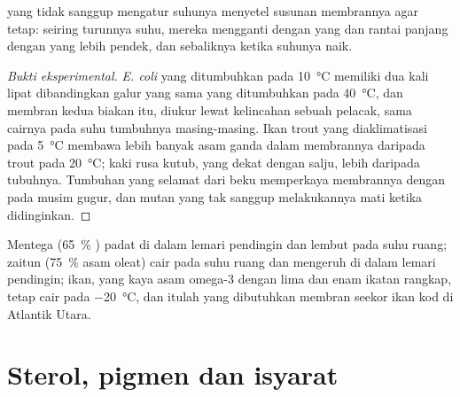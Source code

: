 \begin{proposition}\label{prop:b1:lipids:homeoviscous}
 yang tidak sanggup mengatur suhunya menyetel susunan
membrannya agar  tetap: seiring turunnya suhu, mereka
mengganti  dengan yang  dan rantai panjang
dengan yang lebih pendek, dan sebaliknya ketika suhunya naik.
\end{proposition}
\begin{proof}[Bukti eksperimental]
\emph{E. coli} yang ditumbuhkan pada \qty{10}{\celsius} memiliki dua
kali lipat  dibandingkan galur yang sama yang
ditumbuhkan pada \qty{40}{\celsius}, dan membran kedua biakan itu,
diukur lewat kelincahan sebuah pelacak, sama cairnya pada suhu
tumbuhnya masing-masing. Ikan trout yang diaklimatisasi pada
\qty{5}{\celsius} membawa lebih banyak asam  ganda dalam 
membrannya daripada trout pada \qty{20}{\celsius};  kaki rusa
kutub, yang dekat dengan salju, lebih  daripada 
 tubuhnya. Tumbuhan yang selamat dari beku memperkaya membrannya
dengan   pada musim gugur, dan mutan yang tak sanggup
melakukannya mati ketika didinginkan.
\end{proof}

\begin{example}\label{ex:b1:lipids:kitchen}
Mentega (\qty{65}{\%} ) padat di dalam lemari pendingin dan lembut
pada suhu ruang;  zaitun (\qty{75}{\%} asam oleat) cair pada suhu
ruang dan mengeruh di dalam lemari pendingin;  ikan, yang kaya
asam omega-3 dengan lima dan enam ikatan rangkap, tetap cair pada
\qty{-20}{\celsius}, dan itulah yang dibutuhkan membran seekor ikan kod
di Atlantik Utara.
\end{example}

\section{Sterol, pigmen dan isyarat}

